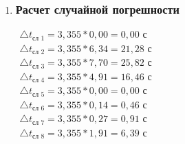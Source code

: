 \begin{enumerate}
		\item \subsubsection*{Расчет случайной погрешности}
		\label{appendix: 13}
		\begin{multicols}{2}
			\(\begin{aligned}\triangle t_{\text{сл 1}} = 3,355 * 0,00 = 0,00 \text{ с}\end{aligned}\) \\ 
			\(\begin{aligned}\triangle t_{\text{сл 2}} = 3,355 * 6,34 = 21,28 \text{ с}\end{aligned}\) \\ 
			\(\begin{aligned}\triangle t_{\text{сл 3}} = 3,355 * 7,70 = 25,82 \text{ с}\end{aligned}\) \\ 
			\(\begin{aligned}\triangle t_{\text{сл 4}} = 3,355 * 4,91 = 16,46 \text{ с}\end{aligned}\) \\
			\vfill 
			\(\begin{aligned}\triangle t_{\text{сл 5}} = 3,355 * 0,00 = 0,00 \text{ с}\end{aligned}\) \\ 
			\(\begin{aligned}\triangle t_{\text{сл 6}} = 3,355 * 0,14 = 0,46 \text{ с}\end{aligned}\) \\ 
			\(\begin{aligned}\triangle t_{\text{сл 7}} = 3,355 * 0,27 = 0,91 \text{ с}\end{aligned}\) \\ 
			\(\begin{aligned}\triangle t_{\text{сл 8}} = 3,355 * 1,91 = 6,39 \text{ с}\end{aligned}\) \\
		\end{multicols}
		

\end{enumerate}
